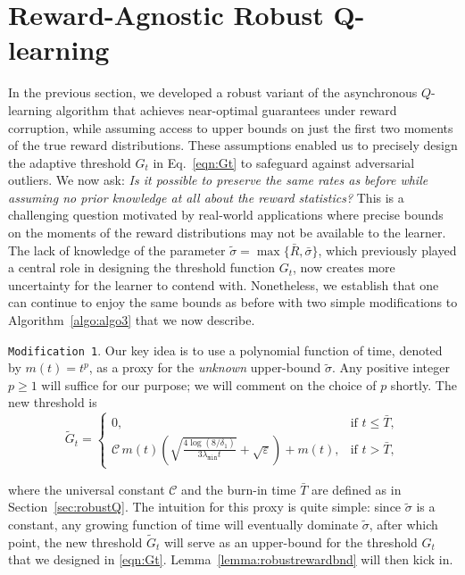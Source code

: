 \documentclass{article}
\newcommand{\mc}{\mathcal}
\begin{document}
\section{Reward-Agnostic Robust Q-learning}
\vspace{-1mm}
\label{sec:raq}
In the previous section, we developed a robust variant of the asynchronous \(Q\)-learning algorithm that achieves near-optimal guarantees under reward corruption, while assuming access to upper bounds on just the first two moments of the true reward distributions. These assumptions enabled us to precisely design the adaptive threshold $G_t$ in Eq.~\eqref{eqn:Gt} to safeguard against adversarial outliers. We now ask: \emph{Is it possible to preserve the same rates as before while assuming no prior knowledge at all about the reward statistics?} This is a challenging question motivated by real-world applications where precise bounds on the moments of the reward distributions may not be available to the learner. The lack of knowledge of the parameter \( \tilde{\sigma} = \max\{\bar{R}, \bar{\sigma}\} \), which previously played a central role in designing the threshold function \(G_t\), now creates more uncertainty for the learner to contend with. Nonetheless, we establish that one can continue to enjoy the same bounds as before with two simple modifications to Algorithm~\ref{algo:algo3} that we now describe. 

\textcolor{winered}{\texttt{Modification 1}.} Our key idea is to use a polynomial function of time, denoted by \( m(t) = t^p \), as a proxy for the \emph{unknown} upper-bound $\tilde{\sigma}$. Any positive integer $p \geq 1$ will suffice for our purpose; we will comment on the choice of $p$ shortly. The new threshold is 
\begin{equation}\label{eqn:Gt_mod}
\tilde{G}_t = 
\begin{cases}
0, & \text{if } t \leq \bar{T}, \\
\mc{C} \, m(t) \left( \sqrt{\frac{4\log(8/\delta_1)}{3\lambda_{\texttt{min}} t} } + \sqrt{\varepsilon} \right) + m(t), & \text{if } t > \bar{T},
\end{cases}
\end{equation}

where the universal constant $\mc{C}$ and the burn-in time $\bar{T}$ are defined as in Section~\ref{sec:robustQ}. The intuition for this proxy is quite simple: since $\tilde{\sigma}$ is a constant, any growing function of time will eventually dominate $\tilde{\sigma}$, after which point, the new threshold $\tilde{G}_t$ will serve as an upper-bound for the threshold $G_t$ that we designed in \eqref{eqn:Gt}. Lemma~\ref{lemma:robustrewardbnd} will then kick in.  
\end{document}
